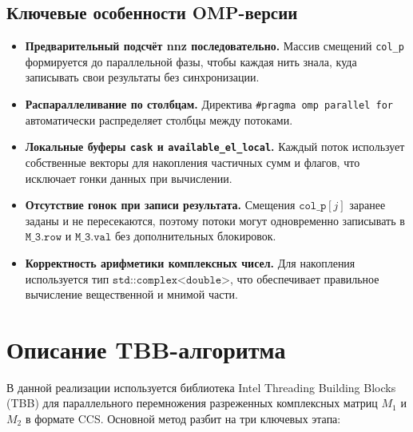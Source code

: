 \documentclass[12pt]{article}
\begin{document}
\subsection*{Ключевые особенности OMP-версии}

\begin{itemize}
    \item \textbf{Предварительный подсчёт nnz последовательно.}  
    Массив смещений \texttt{col\_p} формируется до параллельной фазы, чтобы каждая нить знала, куда записывать свои результаты без синхронизации.
    \item \textbf{Распараллеливание по столбцам.}  
    Директива \verb|#pragma omp parallel for| автоматически распределяет столбцы между потоками.
    \item \textbf{Локальные буферы \texttt{cask} и \texttt{available\_el\_local}.}  
    Каждый поток использует собственные векторы для накопления частичных сумм и флагов, что исключает гонки данных при вычислении.
    \item \textbf{Отсутствие гонок при записи результата.}  
    Смещения \(\texttt{col\_p}[j]\) заранее заданы и не пересекаются, поэтому потоки могут одновременно записывать в \(\texttt{M\_3.row}\) и \(\texttt{M\_3.val}\) без дополнительных блокировок.
    \item \textbf{Корректность арифметики комплексных чисел.}  
    Для накопления используется тип \(\texttt{std::complex<double>}\), что обеспечивает правильное вычисление вещественной и мнимой части.
\end{itemize}

\section{Описание TBB-алгоритма}

В данной реализации используется библиотека Intel Threading Building Blocks (TBB) для параллельного перемножения разреженных комплексных матриц \(M_1\) и \(M_2\) в формате CCS. Основной метод  разбит на три ключевых этапа:
\end{document}

